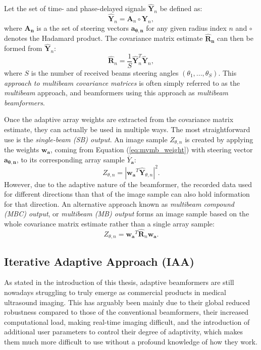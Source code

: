 Let the set of time- and phase-delayed signals $\boldsymbol{\hat{Y}}_n$ be defined as:
\begin{equation}
    \boldsymbol{\hat{Y}}_n = \boldsymbol{A}_n \circ \boldsymbol{Y}_n, 
\label{eq:time_phase_delayed}
\end{equation}
\noindent
where $\boldsymbol{A_n}$ is a the set of steering vectors $\boldsymbol{a_{\theta, n}}$ for any given radius index $n$ and $\circ$ denotes the Hadamard product.
The covariance matrix estimate $\boldsymbol{\hat{R}_n}$ can then be formed from $\boldsymbol{\hat{Y}}_n$:
\begin{equation}
    \boldsymbol{\hat{R}}_n = \frac{1}{S} \boldsymbol{\hat{Y}}_n^T \boldsymbol{\hat{Y}}_n,
\label{eq:mb_covariance}
\end{equation}
\noindent
where $S$ is the number of received beams steering angles $(\theta_1,..., \theta_S)$.
This \textit{approach to multibeam covariance matrices} is often simply referred to as the \textit{multibeam} approach, and beamformers using this approach as \textit{multibeam beamformers}.

Once the adaptive array weights are extracted from the covariance matrix estimate, they can actually be used in multiple ways. The most straightforward use is the \textit{single-beam (SB) output}. An image sample $Z_{\theta,n}$ is created by applying the weights $\boldsymbol{w}_{\boldsymbol{a}}$, coming from Equation (\ref{eq:mvmb_weight}) with steering vector $\boldsymbol{a_{\theta,n}}$, to its corresponding array sample $\bar{Y}_{\boldsymbol{a}}$:
\begin{equation}
    Z_{\theta,n} = | \boldsymbol{w_a}^T \boldsymbol{\hat{Y}}_{\theta, n} |^2.
\end{equation}
\noindent
However, due to the adaptive nature of the beamformer, the recorded data used for different directions than that of the image sample can also hold information for that direction.
An alternative approach known as \textit{multibeam compound (MBC) output}, or \textit{multibeam (MB) output} forms an image sample based on the whole covariance matrix estimate rather than a single array sample:
\begin{equation}
    Z_{\theta,n} = \boldsymbol{w_a}^T \boldsymbol{\hat{R}}_n \boldsymbol{w_a}.
\end{equation}


\subsection{Iterative Adaptive Approach (IAA)}
\label{sec:IAA}
As stated in the introduction of this thesis, adaptive beamformers are still nowadays struggling to truly emerge as commercial products in medical ultrasound imaging. This has arguably been mainly due to their global reduced robustness compared to those of the conventional beamformers, their increased computational load, making real-time imaging difficult, and the introduction of additional user parameters to control their degree of adaptivity, which makes them much more difficult to use without a profound knowledge of how they work. 

